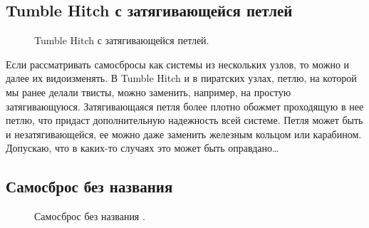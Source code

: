 \subsection{Tumble Hitch с затягивающейся петлей}

\begin{figure}[H]\centering
	\subfloat[Завязывание]{\label{ris:Samosbros_Simple_Noose_1}
	\tcbox[enhanced jigsaw,colframe=black,opacityframe=0.5,opacityback=0.5,height=6.5cm]
		{\centering
			}
		}
\hfil
	\subfloat[Завязывание]{\label{ris:Samosbros_Simple_Noose_2}
	\tcbox[enhanced jigsaw,colframe=black,opacityframe=0.5,opacityback=0.5,height=6.5cm]
		{\centering
			}
		}
\hfil
	\subfloat[Результат]{\label{ris:Samosbros_Simple_Noose_3}
	\tcbox[enhanced jigsaw,colframe=black,opacityframe=0.5,opacityback=0.5]
		{\centering
			}
		}
	\caption{Tumble Hitch с затягивающейся петлей.}\label{ris:Samosbros_Simple_Noose}
\end{figure}

Если рассматривать самосбросы как системы из нескольких узлов, то можно и далее их видоизменять. В Tumble Hitch и в пиратских узлах, петлю, на которой мы ранее делали твисты, можно заменить, например, на простую затягивающуюся. Затягивающаяся петля более плотно обожмет проходящую в нее петлю, что придаст дополнительную надежность всей системе. Петля может быть и незатягивающейся, ее можно даже заменить железным кольцом или карабином. Допускаю, что в каких-то случаях это может быть оправдано\dots

\addtocounter{SamosbrosNoName}{1}

\subsection{Самосброс без названия }

\begin{figure}[H]\centering
	\subfloat[Завязывание]{\label{ris:Piratsky_4_1}
	\tcbox[enhanced jigsaw,colframe=black,opacityframe=0.5,opacityback=0.5,height=6cm]
		{\centering
			}
		}
\hfil
	\subfloat[Затягивание]{\label{ris:Piratsky_4_2}
	\tcbox[enhanced jigsaw,colframe=black,opacityframe=0.5,opacityback=0.5,height=6cm]
		{\centering
			}
		}
\hfil
	\subfloat[Результат]{\label{ris:Piratsky_4_3}
	\tcbox[enhanced jigsaw,colframe=black,opacityframe=0.5,opacityback=0.5]
		{\centering
			}
		}
	\caption{Самосброс без названия .}\label{ris:Piratsky_4}
\end{figure}

